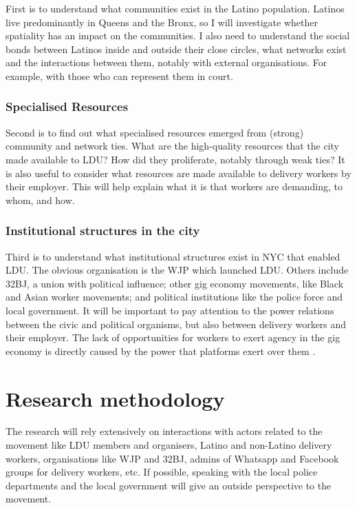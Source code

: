 \documentclass{article}
\begin{document}
First is to understand what communities exist in the Latino population. Latinos live predominantly in Queens and the Bronx, so I will investigate whether spatiality has an impact on the communities. I also need to understand the social bonds between Latinos inside and outside their close circles, what networks exist and the interactions between them, notably with external organisations. For example, with those who can represent them in court.

\subsubsection{Specialised Resources}

Second is to find out what specialised resources emerged from (strong) community and network ties. What are the high-quality resources that the city made available to LDU? How did they proliferate, notably through weak ties?
It is also useful to consider what resources are made available to delivery workers by their employer. This will help explain what it is that workers are demanding, to whom, and how.

\subsubsection{Institutional structures in the city}

Third is to understand what institutional structures exist in NYC that enabled LDU. The obvious organisation is the WJP which launched LDU. Others include 32BJ, a union with political influence; other gig economy movements, like Black and Asian worker movements; and political institutions like the police force and local government. It will be important to pay attention to the power relations between the civic and political organisms, but also between delivery workers and their employer.
The lack of opportunities for workers to exert agency in the gig economy is directly caused by the power that platforms exert over them \parencite{anwar2020hidden}.

\section{Research methodology}

The research will rely extensively on interactions with actors related to the movement like LDU members and organisers, Latino and non-Latino delivery workers, organisations like WJP and 32BJ, admins of Whatsapp and Facebook groups for delivery workers, etc. If possible, speaking with the local police departments and the local government will give an outside perspective to the movement.
\end{document}
